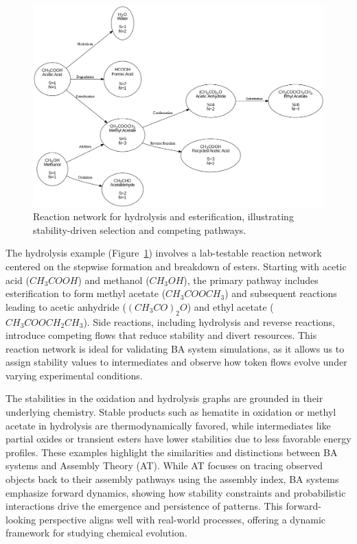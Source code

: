 \documentclass[entropy,article,submit,pdftex,oneauthor]{Definitions/mdpi}
\begin{document}
\begin{figure}[h]
    \centering
    \includegraphics[width=1\textwidth]{abc_hydro.png}
    \caption{Reaction network for hydrolysis and esterification, illustrating stability-driven selection and competing pathways.}
    \label{fig:abc_hydro}
\end{figure}

The hydrolysis example (Figure~\ref{fig:abc_hydro}) involves a lab-testable reaction network centered on the stepwise formation and breakdown of esters. Starting with acetic acid (\(CH_3COOH\)) and methanol (\(CH_3OH\)), the primary pathway includes esterification to form methyl acetate (\(CH_3COOCH_3\)) and subsequent reactions leading to acetic anhydride (\((CH_3CO)_2O\)) and ethyl acetate (\(CH_3COOCH_2CH_3\)). Side reactions, including hydrolysis and reverse reactions, introduce competing flows that reduce stability and divert resources. This reaction network is ideal for validating BA system simulations, as it allows us to assign stability values to intermediates and observe how token flows evolve under varying experimental conditions.

The stabilities in the oxidation and hydrolysis graphs are grounded in their underlying chemistry. Stable products such as hematite in oxidation or methyl acetate in hydrolysis are thermodynamically favored, while intermediates like partial oxides or transient esters have lower stabilities due to less favorable energy profiles. These examples highlight the similarities and distinctions between BA systems and Assembly Theory (AT). While AT focuses on tracing observed objects back to their assembly pathways using the assembly index, BA systems emphasize forward dynamics, showing how stability constraints and probabilistic interactions drive the emergence and persistence of patterns. This forward-looking perspective aligns well with real-world processes, offering a dynamic framework for studying chemical evolution.
\end{document}

